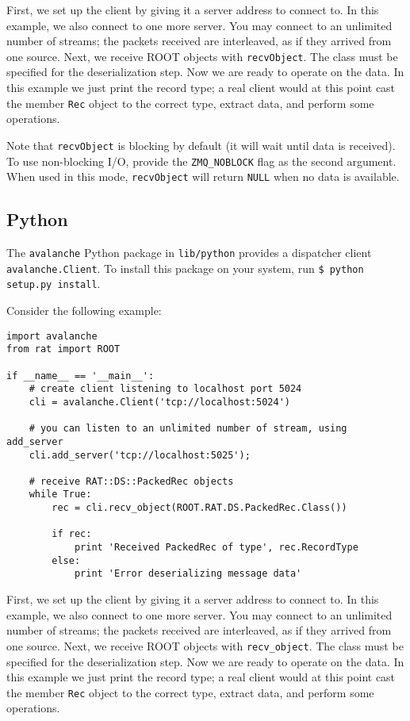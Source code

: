 \documentclass{article}
\begin{document}
First, we set up the client by giving it a server address to connect to. In this example, we also connect to one more server. You may connect to an unlimited number of streams; the packets received are interleaved, as if they arrived from one source. Next, we receive ROOT objects with {\tt recvObject}. The class must be specified for the deserialization step. Now we are ready to operate on the data. In this example we just print the record type; a real client would at this point cast the member {\tt Rec} object to the correct type, extract data, and perform some operations.

Note that {\tt recvObject} is blocking by default (it will wait until data is received). To use non-blocking I/O, provide the {\tt ZMQ\_NOBLOCK} flag as the second argument. When used in this mode, {\tt recvObject} will return {\tt NULL} when no data is available.

\subsection{Python}
The {\tt avalanche} Python package in {\tt lib/python} provides a dispatcher client {\tt avalanche.Client}. To install this package on your system, run {\tt \$ python setup.py install}.

Consider the following example:

\begin{verbatim}
import avalanche
from rat import ROOT

if __name__ == '__main__':
    # create client listening to localhost port 5024
    cli = avalanche.Client('tcp://localhost:5024')

    # you can listen to an unlimited number of stream, using add_server
    cli.add_server('tcp://localhost:5025');

    # receive RAT::DS::PackedRec objects
    while True:
        rec = cli.recv_object(ROOT.RAT.DS.PackedRec.Class())

        if rec:
            print 'Received PackedRec of type', rec.RecordType
        else:
            print 'Error deserializing message data'
\end{verbatim}
First, we set up the client by giving it a server address to connect to. In this example, we also connect to one more server. You may connect to an unlimited number of streams; the packets received are interleaved, as if they arrived from one source. Next, we receive ROOT objects with {\tt recv\_object}. The class must be specified for the deserialization step. Now we are ready to operate on the data. In this example we just print the record type; a real client would at this point cast the member {\tt Rec} object to the correct type, extract data, and perform some operations.
\end{document}
